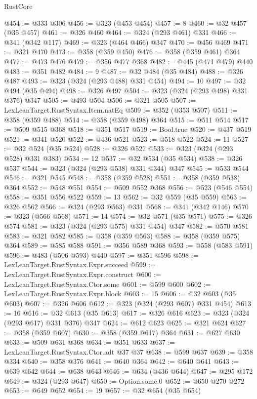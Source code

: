 \begin{lexlean}{RustCore}
\begin{coremodule}
@454 := @333 @306
@456 := @323 (@453 @454)
@457 := 8
@460 := @32 @457 (@35 @457)
@461 := @326 @460
@464 := @324 (@293 @461) @331
@466 := @341 (@342 @117)
@469 := @323 (@464 @466) @347
@470 := @456 @469
@471 := @321 @470
@473 := @358 (@359 @450)
@476 := @358 (@359 @461) @364
@477 := @473 @476
@479 := @356 @477 @368
@482 := @445 (@471 @479) @440
@483 := @351 @482
@484 := 9
@487 := @32 @484 (@35 @484)
@488 := @326 @487
@493 := @323 (@324 (@293 @488) @331 @454)
@494 := 10
@497 := @32 @494 (@35 @494)
@498 := @326 @497
@504 := @323 (@324 (@293 @498) @331 @376) @347
@505 := @493 @504
@506 := @321 @505
@507 := LexLeanTarget.RustSyntax.Item.natEq
@509 := @352 (@353 @507)
@511 := @358 (@359 @488)
@514 := @358 (@359 @498) @364
@515 := @511 @514
@517 := @509 @515 @368
@518 := @351 @517
@519 := Bool.true
@520 := @437 @519
@521 := @341 @520
@522 := @436 @521
@523 := @518 @522
@524 := 11
@527 := @32 @524 (@35 @524)
@528 := @326 @527
@533 := @323 (@324 (@293 @528) @331 @383)
@534 := 12
@537 := @32 @534 (@35 @534)
@538 := @326 @537
@544 := @323 (@324 (@293 @538) @331 @344) @347
@545 := @533 @544
@546 := @321 @545
@548 := @358 (@359 @528)
@551 := @358 (@359 @538) @364
@552 := @548 @551
@554 := @509 @552 @368
@556 := @523 (@546 @554)
@558 := @351 @556 @522
@559 := 13
@562 := @32 @559 (@35 @559)
@563 := @326 @562
@566 := @324 (@293 @563) @331
@568 := @341 (@342 @146)
@570 := @323 (@566 @568)
@571 := 14
@574 := @32 @571 (@35 @571)
@575 := @326 @574
@581 := @323 (@324 (@293 @575) @331 @454) @347
@582 := @570 @581
@583 := @321 @582
@585 := @358 (@359 @563)
@588 := @358 (@359 @575) @364
@589 := @585 @588
@591 := @356 @589 @368
@593 := @558 (@583 @591)
@596 := @483 (@506 @593) @440
@597 := @351 @596
@598 := LexLeanTarget.RustSyntax.Expr.succeed
@599 := LexLeanTarget.RustSyntax.Expr.construct
@600 := LexLeanTarget.RustSyntax.Ctor.some
@601 := @599 @600
@602 := LexLeanTarget.RustSyntax.Expr.block
@603 := 15
@606 := @32 @603 (@35 @603)
@607 := @326 @606
@612 := @323 (@324 (@293 @607) @331 @454)
@613 := 16
@616 := @32 @613 (@35 @613)
@617 := @326 @616
@623 := @323 (@324 (@293 @617) @331 @376) @347
@624 := @612 @623
@625 := @321 @624
@627 := @358 (@359 @607)
@630 := @358 (@359 @617) @364
@631 := @627 @630
@633 := @509 @631 @368
@634 := @351 @633
@637 := LexLeanTarget.RustSyntax.Ctor.adt @37 @37
@638 := @599 @637
@639 := @358 @334
@640 := @358 @376
@641 := @640 @364
@642 := @640 @641
@643 := @639 @642
@644 := @638 @643
@646 := @634 (@436 @644)
@647 := @295 @172
@649 := @324 (@293 @647)
@650 := Option.some.{0}
@652 := @650 @270 @272
@653 := @649 @652
@654 := 19
@657 := @32 @654 (@35 @654)

\end{coremodule}
\end{lexlean}
